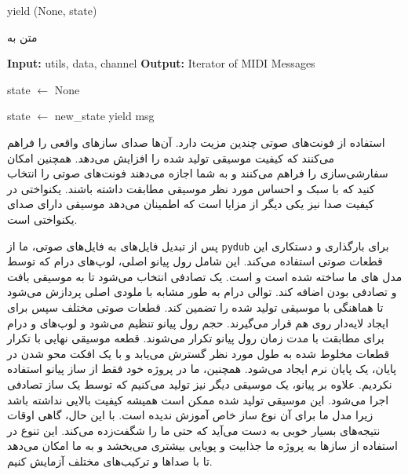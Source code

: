 \begin{LTR}
\begin{algorithm}
\begin{algorithmic}[1]
                  \State yield (None, state)
            \end{algorithmic}
      \end{algorithm}

      \begin{algorithm}
            \setmainfont{Times New Roman}
            \caption{متن به }
            \label{al:strMidi}
            \begin{algorithmic}[1]
                  \State \textbf{Input:} utils, data, channel
                  \State \textbf{Output:} Iterator of MIDI Messages

                  \State state $\leftarrow$ None

                  \State state $\leftarrow$ new\_state
                  \State yield msg
                  \EndIf
                  \EndFor
                  \EndFor

            \end{algorithmic}
      \end{algorithm}
\end{LTR}

استفاده از فونت‌های صوتی چندین مزیت دارد. آن‌ها صدای سازهای واقعی را فراهم
می‌کنند که کیفیت موسیقی تولید شده را افزایش می‌دهد. همچنین امکان
سفارشی‌سازی را فراهم می‌کنند و به شما اجازه می‌دهند فونت‌های صوتی را انتخاب
کنید که با سبک و احساس مورد نظر موسیقی مطابقت داشته باشند. یکنواختی در
کیفیت صدا نیز یکی دیگر از مزایا است که اطمینان می‌دهد موسیقی دارای صدای
یکنواختی است.

پس از تبدیل فایل‌های  به فایل‌های صوتی، ما از \texttt{pydub} برای
بارگذاری و دستکاری این قطعات صوتی استفاده می‌کند. این شامل رول پیانو
اصلی، لوپ‌های درام که توسط مدل های ما ساخته شده است و   است. یک  تصادفی انتخاب می‌شود
تا به موسیقی بافت و تصادفی بودن اضافه کند. توالی درام به طور مشابه با
ملودی اصلی پردازش می‌شود تا هماهنگی با موسیقی تولید شده را تضمین کند.
قطعات صوتی مختلف سپس برای ایجاد لایه‌دار روی هم قرار
می‌گیرند. حجم رول پیانو تنظیم می‌شود و لوپ‌های  و درام برای مطابقت با
مدت زمان رول پیانو تکرار می‌شوند. قطعه موسیقی نهایی با تکرار قطعات مخلوط
شده به طول مورد نظر گسترش می‌یابد و با یک افکت محو شدن در پایان، یک پایان
نرم ایجاد می‌شود.
همچنین، ما در پروژه خود فقط از ساز پیانو استفاده نکردیم. علاوه بر پیانو، یک موسیقی دیگر نیز تولید می‌کنیم که توسط یک ساز تصادفی اجرا می‌شود. این موسیقی تولید شده ممکن است همیشه کیفیت بالایی نداشته باشد زیرا مدل ما برای آن نوع ساز خاص آموزش ندیده است. با این حال، گاهی اوقات نتیجه‌های بسیار خوبی به دست می‌آید که حتی ما را شگفت‌زده می‌کند. این تنوع در استفاده از سازها به پروژه ما جذابیت و پویایی بیشتری می‌بخشد و به ما امکان می‌دهد تا با صداها و ترکیب‌های مختلف آزمایش کنیم.

